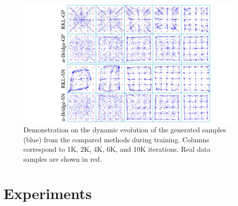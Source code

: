 \documentclass[letterpaper]{article} %
\begin{document}
\begin{figure}[tb]
	\centering
	\includegraphics[width=0.85\columnwidth]{Figures/25Gs_GenProcess_GP_SN.pdf}
	\caption{Demonstration on the dynamic evolution of the generated samples (blue) from the compared methods during training. Columns correspond to 1K, 2K, 4K, 6K, and 10K iterations. Real data samples are shown in red.
	}
	\label{fig:Sample_25G}
\end{figure}



\section{Experiments}
\label{sec:Experim}
\end{document}

